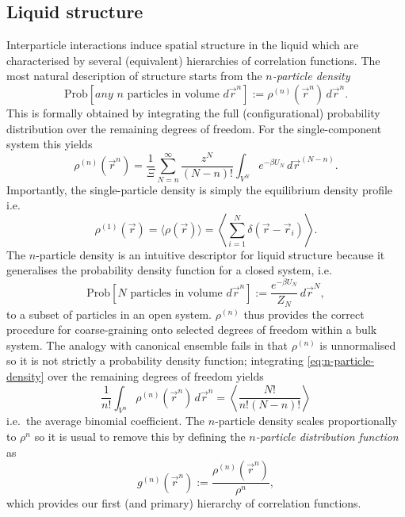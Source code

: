 \subsection{Liquid structure}

Interparticle interactions induce spatial structure in the liquid which are characterised by several (equivalent) hierarchies of correlation functions.
The most natural description of structure starts from the \emph{$n$-particle density}
\begin{equation}\label{eq:n-particle-density-pdf}
  \mathrm{Prob}\left[ \textit{any } n \textrm{ particles in volume } d\vec{r}^n \right]
  :=
  \rho^{(n)}(\vec{r}^n) \, d\vec{r}^n.
\end{equation}
This is formally obtained by integrating the full (configurational) probability distribution over the remaining degrees of freedom.
For the single-component system this yields~\cite{Hansen2013}
\begin{equation}\label{eq:n-particle-density}
  \rho^{(n)}(\vec{r}^n)
  =
  \frac{1}{\Xi}
  \sum_{N=n}^\infty \frac{z^N}{(N-n)!}
  \int_{V^N} e^{-\beta U_N} \, d\vec{r}^{(N-n)}.
\end{equation}
Importantly, the single-particle density is simply the equilibrium density profile i.e.\
\begin{equation}\label{eq:single-particle-density}
  \rho^{(1)}(\vec{r})
  =
  \langle \rho(\vec{r}) \rangle
  =
  \left\langle \sum_{i=1}^N \delta(\vec{r} - \vec{r}_i) \right\rangle.
\end{equation}
The $n$-particle density is an intuitive descriptor for liquid structure because it generalises the probability density function for a closed system, i.e.\
\begin{equation*}
  \mathrm{Prob}\left[ N \textrm{ particles in volume } d\vec{r}^n \right]
  :=
  \frac{e^{-\beta U_N}}{Z_N} \, d\vec{r}^N,
\end{equation*}
to a subset of particles in an open system.
$\rho^{(n)}$ thus provides the correct procedure for coarse-graining onto selected degrees of freedom within a bulk system.
The analogy with canonical ensemble fails in that $\rho^{(n)}$ is unnormalised so it is not strictly a probability density function; integrating \eqref{eq:n-particle-density} over the remaining degrees of freedom yields%
\begin{equation}\label{eq:n-particle-density-normalisation}
  \frac{1}{n!}
  \int_{V^n} \rho^{(n)}(\vec{r}^n) \, d\vec{r}^n
  =
  \left\langle \frac{N!}{n! (N-n)!} \right\rangle
\end{equation}
i.e.\ the average binomial coefficient.
The $n$-particle density scales proportionally to $\rho^n$ so it is usual to remove this by defining the \emph{$n$-particle distribution function} as
\begin{equation}\label{eq:n-particle-distribution}
  g^{(n)}(\vec{r}^n)
  :=
  \frac{\rho^{(n)}(\vec{r}^n)}{\rho^n},
\end{equation}
which provides our first (and primary) hierarchy of correlation functions.

